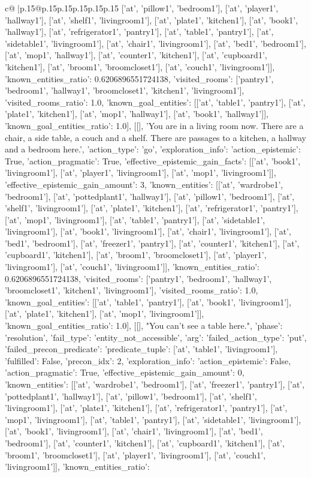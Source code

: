 \documentclass{article}
\begin{document}
{\begin{supertabular}{c@{$\;$}|p{.15\linewidth}@{}p{.15\linewidth}p{.15\linewidth}p{.15\linewidth}p{.15\linewidth}p{.15\linewidth}}
{{{['at', 'pillow1', 'bedroom1'], ['at', 'player1', 'hallway1'], ['at', 'shelf1', 'livingroom1'], ['at', 'plate1', 'kitchen1'], ['at', 'book1', 'hallway1'], ['at', 'refrigerator1', 'pantry1'], ['at', 'table1', 'pantry1'], ['at', 'sidetable1', 'livingroom1'], ['at', 'chair1', 'livingroom1'], ['at', 'bed1', 'bedroom1'], ['at', 'mop1', 'hallway1'], ['at', 'counter1', 'kitchen1'], ['at', 'cupboard1', 'kitchen1'], ['at', 'broom1', 'broomcloset1'], ['at', 'couch1', 'livingroom1']], 'known_entities_ratio': 0.6206896551724138, 'visited_rooms': ['pantry1', 'bedroom1', 'hallway1', 'broomcloset1', 'kitchen1', 'livingroom1'], 'visited_rooms_ratio': 1.0, 'known_goal_entities': [['at', 'table1', 'pantry1'], ['at', 'plate1', 'kitchen1'], ['at', 'mop1', 'hallway1'], ['at', 'book1', 'hallway1']], 'known_goal_entities_ratio': 1.0}}], [[], 'You are in a living room now. There are a chair, a side table, a couch and a shelf. There are passages to a kitchen, a hallway and a bedroom here.', {'action_type': 'go', 'exploration_info': {'action_epistemic': True, 'action_pragmatic': True, 'effective_epistemic_gain_facts': [['at', 'book1', 'livingroom1'], ['at', 'player1', 'livingroom1'], ['at', 'mop1', 'livingroom1']], 'effective_epistemic_gain_amount': 3, 'known_entities': [['at', 'wardrobe1', 'bedroom1'], ['at', 'pottedplant1', 'hallway1'], ['at', 'pillow1', 'bedroom1'], ['at', 'shelf1', 'livingroom1'], ['at', 'plate1', 'kitchen1'], ['at', 'refrigerator1', 'pantry1'], ['at', 'mop1', 'livingroom1'], ['at', 'table1', 'pantry1'], ['at', 'sidetable1', 'livingroom1'], ['at', 'book1', 'livingroom1'], ['at', 'chair1', 'livingroom1'], ['at', 'bed1', 'bedroom1'], ['at', 'freezer1', 'pantry1'], ['at', 'counter1', 'kitchen1'], ['at', 'cupboard1', 'kitchen1'], ['at', 'broom1', 'broomcloset1'], ['at', 'player1', 'livingroom1'], ['at', 'couch1', 'livingroom1']], 'known_entities_ratio': 0.6206896551724138, 'visited_rooms': ['pantry1', 'bedroom1', 'hallway1', 'broomcloset1', 'kitchen1', 'livingroom1'], 'visited_rooms_ratio': 1.0, 'known_goal_entities': [['at', 'table1', 'pantry1'], ['at', 'book1', 'livingroom1'], ['at', 'plate1', 'kitchen1'], ['at', 'mop1', 'livingroom1']], 'known_goal_entities_ratio': 1.0}}], [[], "You can't see a table here.", {'phase': 'resolution', 'fail_type': 'entity_not_accessible', 'arg': {'failed_action_type': 'put', 'failed_precon_predicate': {'predicate_tuple': ['at', 'table1', 'livingroom1'], 'fulfilled': False, 'precon_idx': 2}}, 'exploration_info': {'action_epistemic': False, 'action_pragmatic': True, 'effective_epistemic_gain_amount': 0, 'known_entities': [['at', 'wardrobe1', 'bedroom1'], ['at', 'freezer1', 'pantry1'], ['at', 'pottedplant1', 'hallway1'], ['at', 'pillow1', 'bedroom1'], ['at', 'shelf1', 'livingroom1'], ['at', 'plate1', 'kitchen1'], ['at', 'refrigerator1', 'pantry1'], ['at', 'mop1', 'livingroom1'], ['at', 'table1', 'pantry1'], ['at', 'sidetable1', 'livingroom1'], ['at', 'book1', 'livingroom1'], ['at', 'chair1', 'livingroom1'], ['at', 'bed1', 'bedroom1'], ['at', 'counter1', 'kitchen1'], ['at', 'cupboard1', 'kitchen1'], ['at', 'broom1', 'broomcloset1'], ['at', 'player1', 'livingroom1'], ['at', 'couch1', 'livingroom1']], 'known_entities_ratio': }}}
\end{supertabular}}
\end{document}

